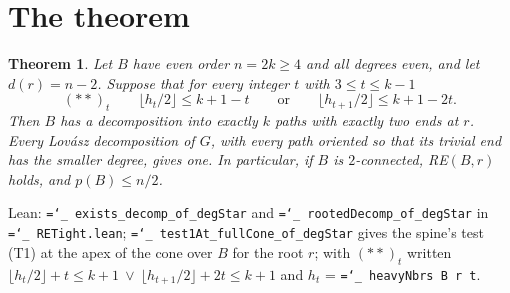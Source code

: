 \documentclass[11pt]{amsart}
\newtheorem{theorem}{Theorem}[section]
\theoremstyle{definition}
\newcommand{\lean}[1]{\texttt{\hyphenchar\font=`\_ #1}}
\begin{document}
\section{The theorem}\label{sec:main}

\begin{theorem}\label{thm:main}
Let $B$ have even order $n=2k\ge4$ and all degrees even, and let $d(r)=n-2$. Suppose that for every
integer $t$ with $3\le t\le k-1$
\[
(\ast\ast)_t\qquad \lfloor h_t/2\rfloor\le k+1-t\qquad\text{or}\qquad \lfloor h_{t+1}/2\rfloor\le k+1-2t .
\]
Then $B$ has a decomposition into exactly $k$ paths with exactly two ends at $r$. Every Lov\'asz
decomposition of $G$, with every path oriented so that its trivial end has the smaller degree, gives
one. In particular, if $B$ is $2$-connected, RE$(B,r)$ holds, and $p(B)\le n/2$.
\end{theorem}

Lean: \lean{exists\_decomp\_of\_degStar} and \lean{rootedDecomp\_of\_degStar} in
\lean{RETight.lean}; \lean{test1At\_fullCone\_of\_degStar} gives the spine's test (T1) at the apex
of the cone over $B$ for the root $r$; with $(\ast\ast)_t$ written $\lfloor h_t/2\rfloor+t\le k+1\ \vee\ \lfloor
h_{t+1}/2\rfloor+2t\le k+1$ and $h_t$ = \lean{heavyNbrs B r t}.
\end{document}
